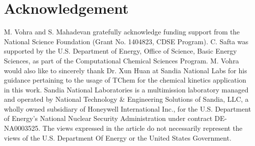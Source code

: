 \section*{Acknowledgement}

M. Vohra and S. Mahadevan gratefully acknowledge funding support from the
National Science Foundation (Grant No. 1404823, CDSE Program). 
C. Safta was supported by the U.S. Department of Energy, Office of Science,
Basic Energy Sciences, as part of the Computational Chemical Sciences Program.
M. Vohra would also like to sincerely thank Dr. Xun Huan at Sandia National Labs for
his guidance pertaining to the usage of TChem for the chemical kinetics application
in this work. Sandia National Laboratories is a multimission laboratory managed 
and operated by National Technology \& Engineering Solutions of Sandia, LLC, 
a wholly owned subsidiary of Honeywell International Inc., for the 
U.S. Department of Energy's National Nuclear Security Administration under contract DE-NA0003525. 
The views expressed in the article do not necessarily represent the
views of the U.S. Department Of Energy or the United States Government.